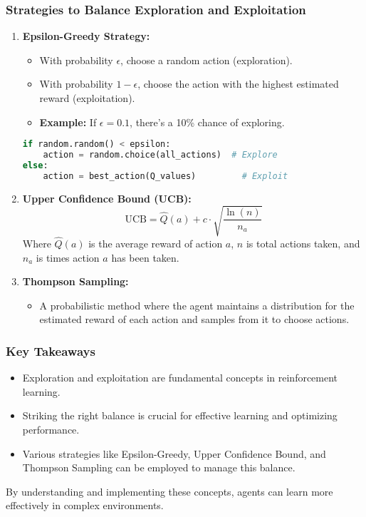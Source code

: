 \documentclass[aspectratio=169]{beamer}
\begin{document}
\begin{frame}[fragile]
  \frametitle{Strategies to Balance Exploration and Exploitation}
  \begin{enumerate}
    \item \textbf{Epsilon-Greedy Strategy:}
      \begin{itemize}
        \item With probability $\epsilon$, choose a random action (exploration).
        \item With probability $1-\epsilon$, choose the action with the highest estimated reward (exploitation).
        \item \textbf{Example:} If $\epsilon = 0.1$, there's a 10\% chance of exploring.
      \end{itemize}
      \begin{lstlisting}[language=Python]
if random.random() < epsilon: 
    action = random.choice(all_actions)  # Explore
else: 
    action = best_action(Q_values)         # Exploit
      \end{lstlisting}

    \item \textbf{Upper Confidence Bound (UCB):}
      \begin{equation}
        \text{UCB} = \hat{Q}(a) + c \cdot \sqrt{\frac{\ln(n)}{n_a}}
      \end{equation}
      Where $\hat{Q}(a)$ is the average reward of action $a$, $n$ is total actions taken, and $n_a$ is times action $a$ has been taken.

    \item \textbf{Thompson Sampling:}
      \begin{itemize}
        \item A probabilistic method where the agent maintains a distribution for the estimated reward of each action and samples from it to choose actions.
      \end{itemize}
  \end{enumerate}
\end{frame}

\begin{frame}[fragile]
  \frametitle{Key Takeaways}
  \begin{itemize}
    \item Exploration and exploitation are fundamental concepts in reinforcement learning.
    \item Striking the right balance is crucial for effective learning and optimizing performance.
    \item Various strategies like Epsilon-Greedy, Upper Confidence Bound, and Thompson Sampling can be employed to manage this balance.
  \end{itemize}
  By understanding and implementing these concepts, agents can learn more effectively in complex environments.
\end{frame}
\end{document}
